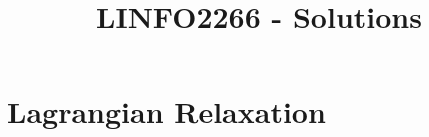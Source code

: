 \documentclass[a4paper]{article}
\title{LINFO2266 - Solutions}
\begin{document}
\maketitle

\section{Lagrangian Relaxation}

\end{document}
